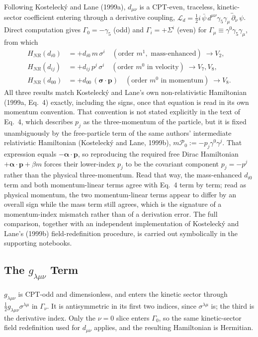 Following Kostelecký and Lane (1999a), $d_{\mu\nu}$ is a CPT-even,
traceless, kinetic-sector coefficient entering through a derivative
coupling, $\mathcal L_d = \tfrac12 i\,\bar\psi\,d^{\mu\nu}\gamma_5\gamma_\mu\,
\overleftrightarrow\partial_\nu\,\psi$. Direct computation gives
$\Gamma_0=-\gamma_5$ (odd) and $\Gamma_i=+\Sigma^i$ (even) for
$\Gamma_\mu\equiv\gamma^0\gamma_5\gamma_\mu$, from which
\begin{align}
  H_{NR}(d_{i0}) &= +d_{i0}\,m\,\sigma^i \quad (\text{order } m^1,\text{ mass-enhanced}) \;\to V_2, \\
  H_{NR}(d_{ij}) &= +d_{ij}\,p^j\,\sigma^i \quad (\text{order } m^0 \text{ in velocity}) \;\to V_7, V_8, \\
  H_{NR}(d_{00}) &= +d_{00}\,(\boldsymbol\sigma\cdot\mathbf p) \quad (\text{order } m^0 \text{ in momentum}) \;\to V_8.
\end{align}
All three results match Kostelecký and Lane's own non-relativistic
Hamiltonian (1999a, Eq.~4) exactly, including the signs, once that equation
is read in its own momentum convention. That convention is not stated
explicitly in the text of Eq.~4, which describes $p_j$ as the
three-momentum of the particle, but it is fixed unambiguously by the
free-particle term of the same authors' intermediate relativistic
Hamiltonian (Kostelecký and Lane, 1999b), $m\mathcal{P}_0:=-p_j\gamma^0\gamma^j$. That expression equals
$-\boldsymbol\alpha\cdot\mathbf p$, so reproducing the required free Dirac
Hamiltonian $+\boldsymbol\alpha\cdot\mathbf p+\beta m$ forces their
lower-index $p_j$ to be the covariant component $p_j=-p^j$ rather than the
physical three-momentum. Read that way, the mass-enhanced $d_{i0}$ term and
both momentum-linear terms agree with Eq.~4 term by term; read as physical
momentum, the two momentum-linear terms appear to differ by an overall
sign while the mass term still agrees, which is the signature of a
momentum-index mismatch rather than of a derivation error. The full
comparison, together with an independent implementation of Kostelecký and
Lane's (1999b) field-redefinition procedure, is carried out symbolically in the
supporting notebooks.

\subsection{The \texorpdfstring{$g_{\lambda\mu\nu}$}{g\_lambda\_mu\_nu} Term}
\label{sec:results-fw-g}

$g_{\lambda\mu\nu}$ is CPT-odd and dimensionless, and enters the
kinetic sector through $\tfrac12 g_{\lambda\mu\nu}\sigma^{\lambda\mu}$ in
$\Gamma_\nu$. It is antisymmetric in its first two indices, since
$\sigma^{\lambda\mu}$ is; the third is the derivative index. Only the
$\nu=0$ slice enters $\Gamma_0$, so the same kinetic-sector field
redefinition used for $d_{\mu\nu}$ applies, and the resulting Hamiltonian is
Hermitian.

